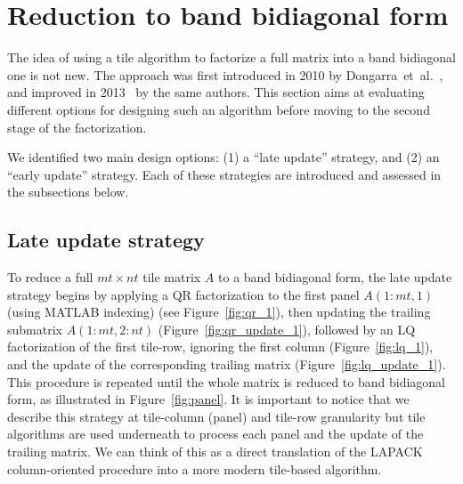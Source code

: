 \section{Reduction  to band bidiagonal form}
\label{sec:band}
The idea of using a tile algorithm to factorize a full matrix into
a band bidiagonal one is not new.
The approach was first introduced in 2010 by
Dongarra~et~al\@.~\cite{ltaief2010parallel},
and improved in 2013~\cite{haidar2013improved}
by the same authors.
This section aims at evaluating different options for
designing such an algorithm
before moving to the second stage of the factorization.

We identified two main design options:
(1) a ``late update'' strategy, and
(2) an ``early update'' strategy.
Each of these strategies are introduced
and assessed in the subsections below.

\subsection{Late update strategy}
To reduce a full $mt \times nt$ tile matrix $A$ to a band bidiagonal
form, the late update strategy begins by applying a QR
factorization to the first panel $A(1:mt,1)$ (using MATLAB indexing)
(see Figure~\ref{fig:qr_1}), then updating the trailing
submatrix $A(1:mt,2:nt)$ (Figure~\ref{fig:qr_update_1}), followed
by an LQ factorization of the first tile-row,
ignoring the first column (Figure~\ref{fig:lq_1}),
and the update of the corresponding trailing matrix
(Figure~\ref{fig:lq_update_1}).
This procedure is repeated until the whole matrix is reduced to
band bidiagonal form, as illustrated in Figure~\ref{fig:panel}.
It is important to notice that we describe this strategy
at tile-column (panel) and tile-row granularity but
tile algorithms are used underneath to process each panel
and the update of the trailing matrix.
We can think of this as a direct translation of the LAPACK
column-oriented procedure into a
more modern tile-based algorithm.

